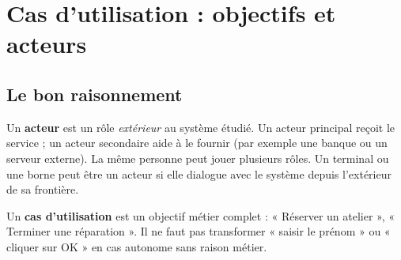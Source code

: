 \documentclass[10pt,a4paper]{article}
\begin{document}
\section{Cas d'utilisation : objectifs et acteurs}
\subsection{Le bon raisonnement}
Un \textbf{acteur} est un rôle \emph{extérieur} au système étudié. Un acteur principal reçoit le service ; un acteur secondaire aide à le fournir (par exemple une banque ou un serveur externe). La même personne peut jouer plusieurs rôles. Un terminal ou une borne peut être un acteur si elle dialogue avec le système depuis l'extérieur de sa frontière.

Un \textbf{cas d'utilisation} est un objectif métier complet : « Réserver un atelier », « Terminer une réparation ». Il ne faut pas transformer « saisir le prénom » ou « cliquer sur OK » en cas autonome sans raison métier.

\begin{center}
\end{center}
\end{document}
